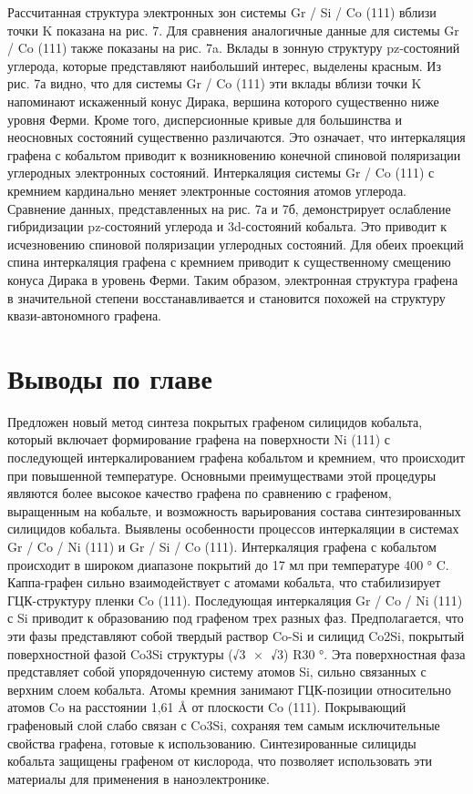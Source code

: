 Рассчитанная структура электронных зон системы Gr / Si / Co (111) вблизи точки K показана на рис. 7. Для сравнения аналогичные данные для системы Gr / Co (111) также показаны на рис. 7a. Вклады в зонную структуру pz-состояний углерода, которые представляют наибольший интерес, выделены красным. Из рис. 7а видно, что для системы Gr / Co (111) эти вклады вблизи точки K напоминают искаженный конус Дирака, вершина которого существенно ниже уровня Ферми. Кроме того, дисперсионные кривые для большинства и неосновных состояний существенно различаются. Это означает, что интеркаляция графена с кобальтом приводит к возникновению конечной спиновой поляризации углеродных электронных состояний. Интеркаляция системы Gr / Co (111) с кремнием кардинально меняет электронные состояния атомов углерода. Сравнение данных, представленных на рис. 7а и 7б, демонстрирует ослабление гибридизации pz-состояний углерода и 3d-состояний кобальта. Это приводит к исчезновению спиновой поляризации углеродных состояний. Для обеих проекций спина интеркаляция графена с кремнием приводит к существенному смещению конуса Дирака в уровень Ферми. Таким образом, электронная структура графена в значительной степени восстанавливается и становится похожей на структуру квази-автономного графена.

\section{Выводы по главе}\label{sec:ch1/sec1}
Предложен новый метод синтеза покрытых графеном силицидов кобальта, который включает формирование графена на поверхности Ni (111) с последующей интеркалированием графена кобальтом и кремнием, что происходит при повышенной температуре. Основными преимуществами этой процедуры являются более высокое качество графена по сравнению с графеном, выращенным на кобальте, и возможность варьирования состава синтезированных силицидов кобальта. Выявлены особенности процессов интеркаляции в системах Gr / Co / Ni (111) и Gr / Si / Co (111). Интеркаляция графена с кобальтом происходит в широком диапазоне покрытий до 17 мл при температуре 400 ° C. Каппа-графен сильно взаимодействует с атомами кобальта, что стабилизирует ГЦК-структуру пленки Co (111). Последующая интеркаляция Gr / Co / Ni (111) с Si приводит к образованию под графеном трех разных фаз. Предполагается, что эти фазы представляют собой твердый раствор Co-Si и силицид Co2Si, покрытый поверхностной фазой Co3Si структуры (√3 × √3) R30 °. Эта поверхностная фаза представляет собой упорядоченную систему атомов Si, сильно связанных с верхним слоем кобальта. Атомы кремния занимают ГЦК-позиции относительно атомов Co на расстоянии 1,61 Å от плоскости Co (111). Покрывающий графеновый слой слабо связан с Co3Si, сохраняя тем самым исключительные свойства графена, готовые к использованию. Синтезированные силициды кобальта защищены графеном от кислорода, что позволяет использовать эти материалы для применения в наноэлектронике.